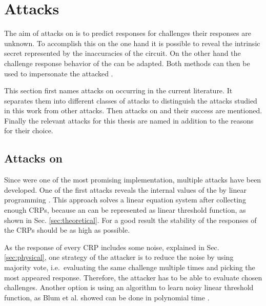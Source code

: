 \chapter{Attacks}
\label{cap:attacks}

The aim of attacks on \apuf is to predict responses for challenges their responses are unknown.
To accomplish this on the one hand it is possible to reveal the intrinsic secret represented by the inaccuracies of the \apuf circuit.
On the other hand the challenge response behavior of the \puf can be adapted.
Both methods can then be used to impersonate the attacked \puf.

This section first names attacks on \apufs occurring in the current literature.
It separates them into different classes of attacks to distinguish the attacks studied in this work from other attacks.
Then attacks on \xpufs and their success are mentioned.
Finally the relevant attacks for this thesis are named in addition to the reasons for their choice.


\section{Attacks on \apufs}
\label{sec:attacksonarbiter}

Since \apufs were one of the most promising \puf implementation, multiple attacks have been developed.
One of the first attacks reveals the internal values of the \apuf by linear programming \cite{Ozturk2008TowardsDevices}.
This approach solves a linear equation system after collecting enough \acp{CRP}, because an \apuf can be represented as linear threshold function, as shown in Sec. \ref{sec:theoretical}. %
For a good result the stability of the responses of the \acp{CRP} should be as high as possible.

As the response of every \ac{CRP} includes some noise, explained in Sec. \ref{sec:physical}, one strategy of the attacker is to reduce the noise by using majority vote, i.e.\ evaluating the same challenge multiple times and picking the most appeared response.
Therefore, the attacker has to be able to evaluate chosen challenges. %
Another option is using an algorithm to learn noisy linear threshold function, as Blum et al. showed can be done in polynomial time \cite{Blum1998AlgorithmicaNoisy}.

